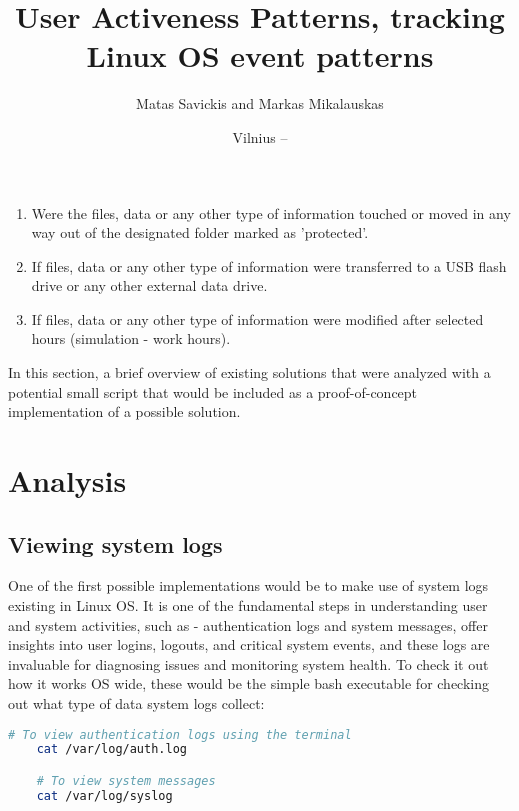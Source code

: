 \documentclass{VUMIFPSmagistrinis}
\title{User Activeness Patterns, tracking Linux OS event patterns}
\author{Matas Savickis and Markas Mikalauskas}
\date{Vilnius – \the\year}
\begin{document}

\maketitle

\tableofcontents



\begin{enumerate}
    \item Were the files, data or any other type of information touched or moved in any way out of the designated folder marked as 'protected'.
    \item If files, data or any other type of information were transferred to a USB flash drive or any other external data drive.
    \item If files, data or any other type of information were modified after selected hours (simulation - work hours).
\end{enumerate}

In this section, a brief overview of existing solutions that were analyzed with a potential small script that would be included as a proof-of-concept implementation of a possible solution. 

\section{Analysis}
\subsection{Viewing system logs}
One of the first possible implementations would be to make use of system logs existing in Linux OS. It is one of the fundamental steps in understanding user and system activities, such as - authentication logs and system messages, offer insights into user logins, logouts, and critical system events, and these logs are invaluable for diagnosing issues and monitoring system health. To check it out how it works OS wide, these would be the simple bash executable for checking out what type of data system logs collect:

\begin{lstlisting}[language=bash]
    # To view authentication logs using the terminal
    cat /var/log/auth.log 

    # To view system messages
    cat /var/log/syslog
\end{lstlisting}
\end{document}
